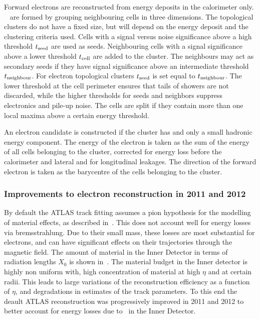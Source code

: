 Forward electrons are reconstructed from energy deposits in the calorimeter
only. ~\cite{Lampl:1099735} are formed by grouping neighbouring cells in three
dimensions. The topological clusters do not have a fixed size, but will depend
on the energy deposit and the clustering criteria used. Cells with a
signal versus noise significance above a high threshold $t_{\rm{seed}}$ are used as seeds.
Neighbouring cells with a signal significance above a lower threshold
$t_{\rm{cell}}$ are added to the cluster. The neighbours may act as
secondary seeds if they have signal significance above an intermediate threshold
$t_{\rm{neighbour}}$. For electron topological clusters $t_{\rm{seed}}$ is set
equal to $t_{\rm{neighbour}}$. The lower threshold at the cell perimeter ensures that
tails of showers are not discarded, while the higher thresholds for seeds and
neighbors suppress electronics and pile-up noise. The cells are split if they
contain more than one local maxima above a certain energy threshold. 

An electron candidate is constructed if the cluster has  and only a
small hadronic energy component. The energy
of the electron is taken as the sum of the energy of all cells belonging to the cluster,
corrected for energy loss before the calorimeter and lateral and for longitudinal
leakages. The direction of the forward electron is taken as the barycentre of the cells
belonging to the cluster.

\subsubsection{Improvements to electron reconstruction in 2011 and 2012}

By default the ATLAS track fitting assumes a pion hypothesis for the modelling
of material effects, as described in~. This does not account well for energy losses via
bremsstrahlung. Due to their small mass, these losses are most substantial for
electrons, and can have significant effects on their trajectories through the magnetic
field. The amount of material in the Inner Detector in terms of radiation lengths
$X_{0}$ is shown in~. The material budget in the Inner detector
is highly non uniform with, high concentration of material at high $\eta$ and at certain radii.
This leads to large variations of the reconstruction efficiency as a function of
$\eta$, and degradations in estimates of the track parameters. To this end the
deault ATLAS reconstruction was progressively improved in 2011 and 2012 to
better account for energy losses due to \brem\ in the Inner Detector.

